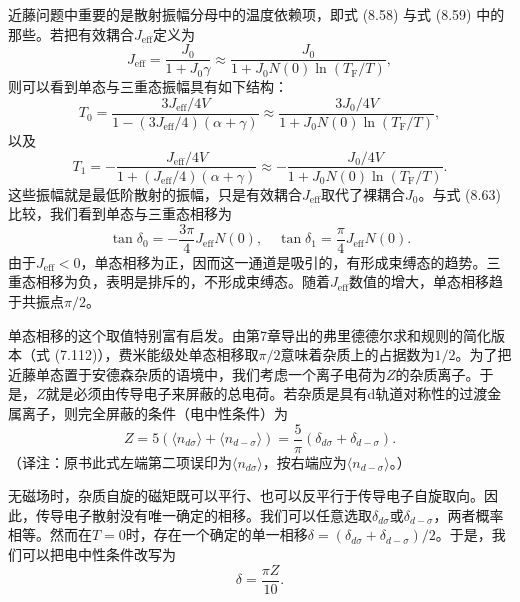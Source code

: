 近藤问题中重要的是散射振幅分母中的温度依赖项，即式 (8.58) 与式 (8.59) 中的那些。若把有效耦合$J_{\mathrm{eff}}$定义为
\begin{equation*}
J_{\mathrm{eff}} = \frac{J_0}{1+J_0\gamma}\approx\frac{J_0}{1+J_0N(0)\ln(T_{\mathrm{F}}/T)},
\tag{8.64}
\end{equation*}
则可以看到单态与三重态振幅具有如下结构：
\begin{equation*}
T_0 = \frac{3J_{\mathrm{eff}}/4V}{1-(3J_{\mathrm{eff}}/4)(\alpha+\gamma)}\approx\frac{3J_0/4V}{1+J_0N(0)\ln(T_{\mathrm{F}}/T)},
\tag{8.65}
\end{equation*}
以及
\begin{equation*}
T_1 = -\frac{J_{\mathrm{eff}}/4V}{1+(J_{\mathrm{eff}}/4)(\alpha+\gamma)}\approx-\frac{J_0/4V}{1+J_0N(0)\ln(T_{\mathrm{F}}/T)}.
\tag{8.66}
\end{equation*}
这些振幅就是最低阶散射的振幅，只是有效耦合$J_{\mathrm{eff}}$取代了裸耦合$J_0$。与式 (8.63) 比较，我们看到单态与三重态相移为
\begin{equation*}
\tan\delta_0 = -\frac{3\pi}{4}J_{\mathrm{eff}}N(0), \quad \tan\delta_1 = \frac{\pi}{4}J_{\mathrm{eff}}N(0).
\tag{8.67}
\end{equation*}
由于$J_{\mathrm{eff}}<0$，单态相移为正，因而这一通道是吸引的，有形成束缚态的趋势。三重态相移为负，表明是排斥的，不形成束缚态。随着$J_{\mathrm{eff}}$数值的增大，单态相移趋于共振点$\pi/2$。

单态相移的这个取值特别富有启发。由第7章导出的弗里德德尔求和规则的简化版本（式 (7.112)），费米能级处单态相移取$\pi/2$意味着杂质上的占据数为$1/2$。为了把近藤单态置于安德森杂质的语境中，我们考虑一个离子电荷为$Z$的杂质离子。于是，$Z$就是必须由传导电子来屏蔽的总电荷。若杂质是具有d轨道对称性的过渡金属离子，则完全屏蔽的条件（电中性条件）为
\begin{equation*}
Z = 5(\langle n_{d\sigma}\rangle+\langle n_{d-\sigma}\rangle) = \frac{5}{\pi}(\delta_{d\sigma}+\delta_{d-\sigma}).
\tag{8.68}
\end{equation*}
（译注：原书此式左端第二项误印为$\langle n_{d\sigma}\rangle$，按右端应为$\langle n_{d-\sigma}\rangle$。）

无磁场时，杂质自旋的磁矩既可以平行、也可以反平行于传导电子自旋取向。因此，传导电子散射没有唯一确定的相移。我们可以任意选取$\delta_{d\sigma}$或$\delta_{d-\sigma}$，两者概率相等。然而在$T=0$时，存在一个确定的单一相移$\delta=(\delta_{d\sigma}+\delta_{d-\sigma})/2$。于是，我们可以把电中性条件改写为
\begin{equation*}
\delta = \frac{\pi Z}{10}.
\tag{8.69}
\end{equation*}

